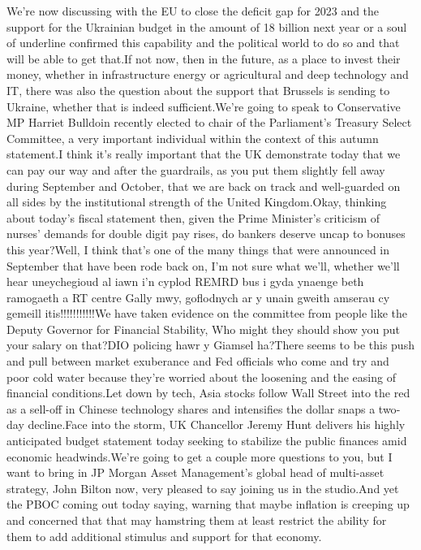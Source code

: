 \documentclass{article}%
\begin{document}
We're now discussing with the EU to close the deficit gap for 2023 and the support for the Ukrainian budget in the amount of 18 billion next year or a soul of underline confirmed this capability and the political world to do so and that will be able to get that.If not now, then in the future, as a place to invest their money, whether in infrastructure energy or agricultural and deep technology and IT, there was also the question about the support that Brussels is sending to Ukraine, whether that is indeed sufficient.We're going to speak to Conservative MP Harriet Bulldoin recently elected to chair of the Parliament's Treasury Select Committee, a very important individual within the context of this autumn statement.I think it's really important that the UK demonstrate today that we can pay our way and after the guardrails, as you put them slightly fell away during September and October, that we are back on track and well{-}guarded on all sides by the institutional strength of the United Kingdom.Okay, thinking about today's fiscal statement then, given the Prime Minister's criticism of nurses' demands for double digit pay rises, do bankers deserve uncap to bonuses this year?Well, I think that's one of the many things that were announced in September that have been rode back on, I'm not sure what we'll, whether we'll hear uneychegioud al iawn i'n cyplod REMRD bus i gyda ynaenge beth ramogaeth a RT centre Gally mwy, goflodnych ar y unain gweith amserau cy gemeill itis!!!!!!!!!!!We have taken evidence on the committee from people like the Deputy Governor for Financial Stability, Who might they should show you put your salary on that?DIO policing hawr y Giamsel ha?There seems to be this push and pull between market exuberance and Fed officials who come and try and poor cold water because they're worried about the loosening and the easing of financial conditions.Let down by tech, Asia stocks follow Wall Street into the red as a sell{-}off in Chinese technology shares and intensifies the dollar snaps a two{-}day decline.Face into the storm, UK Chancellor Jeremy Hunt delivers his highly anticipated budget statement today seeking to stabilize the public finances amid economic headwinds.We're going to get a couple more questions to you, but I want to bring in JP Morgan Asset Management's global head of multi{-}asset strategy, John Bilton now, very pleased to say joining us in the studio.And yet the PBOC coming out today saying, warning that maybe inflation is creeping up and concerned that that may hamstring them at least restrict the ability for them to add additional stimulus and support for that economy.%
\end{document}
